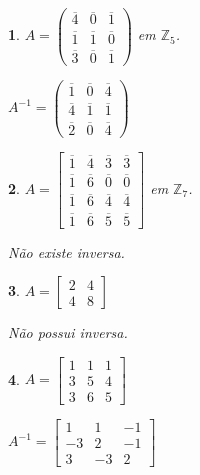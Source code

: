 \documentclass[12pt]{exam}
\newtheorem{exercicio}{}
\newcommand{\integer}{\mathbb{Z}}
\begin{document}
\begin{exercicio}
$A = \begin{pmatrix}
    \overline{4} & \overline{0} & \overline{1}\\
    \overline{1} & \overline{1} & \overline{0}\\
    \overline{3} & \overline{0} & \overline{1}
  \end{pmatrix}$ em $\integer_5$.
\begin{solucao}
  $A^{-1} = \begin{pmatrix}
    \overline{1} & \overline{0} & \overline{4}\\
    \overline{4} & \overline{1} & \overline{1}\\
    \overline{2} & \overline{0} & \overline{4}
  \end{pmatrix}$
\end{solucao}
\end{exercicio}

\begin{exercicio}
$A = \begin{bmatrix}
    \overline{1} & \overline{4} & \overline{3} & \overline{3}\\
    \overline{1} & \overline{6} & \overline{0} & \overline{0}\\
    \overline{1} & \overline{6} & \overline{4} & \overline{4}\\
    \overline{1} & \overline{6} & \overline{5} & \overline{5}
  \end{bmatrix}$ em $\integer_7$.
\begin{solucao}
  N\~ao existe inversa.
\end{solucao}
\end{exercicio}

\begin{exercicio}
$A =\begin{bmatrix}
    2 & 4\\
    4 & 8
  \end{bmatrix}$
\begin{solucao}
  N\~ao possui inversa.
\end{solucao}
\end{exercicio}

\begin{exercicio}
$A =\begin{bmatrix}
    1 & 1 & 1\\
    3 & 5 & 4\\
    3 & 6 & 5
  \end{bmatrix}$
\begin{solucao}
  $A^{-1} =\begin{bmatrix}
    1 & 1 & -1\\
    -3 & 2 & -1\\
    3 & -3 & 2
  \end{bmatrix}$
\end{solucao}
\end{exercicio}
\end{document}
